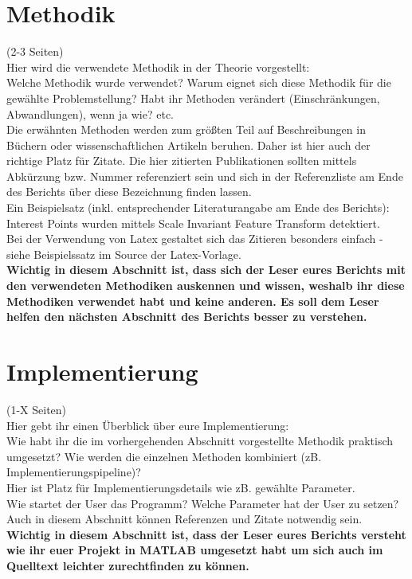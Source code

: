 \documentclass[paper=A4, deutsch]{scrartcl}
\begin{document}
\section{Methodik}
(2-3 Seiten)\\
Hier wird die verwendete Methodik in der Theorie vorgestellt:\\
Welche Methodik wurde verwendet? Warum eignet sich diese Methodik für die gewählte Problemstellung? Habt ihr Methoden verändert (Einschränkungen, Abwandlungen), wenn ja wie? etc.\\
Die erwähnten Methoden werden zum größten Teil auf Beschreibungen in Büchern oder wissenschaftlichen Artikeln beruhen. Daher ist hier auch der richtige Platz für Zitate. Die hier zitierten Publikationen sollten mittels Abkürzung bzw. Nummer referenziert sein und sich in der Referenzliste am Ende des Berichts über diese Bezeichnung finden lassen.\\
Ein Beispielsatz (inkl. entsprechender Literaturangabe am Ende des Berichts): Interest Points wurden mittels Scale Invariant Feature Transform detektiert.\\
Bei der Verwendung von Latex gestaltet sich das Zitieren besonders einfach - siehe Beispielssatz im Source der Latex-Vorlage.\\
\textbf{Wichtig in diesem Abschnitt ist, dass sich der Leser eures Berichts mit den verwendeten Methodiken auskennen und wissen, weshalb ihr diese Methodiken verwendet habt und keine anderen. Es soll dem Leser helfen den nächsten Abschnitt des Berichts besser zu verstehen.}

\section{Implementierung}
(1-X Seiten)\\
Hier gebt ihr einen Überblick über eure Implementierung:\\
Wie habt ihr die im vorhergehenden Abschnitt vorgestellte Methodik praktisch umgesetzt? Wie werden die einzelnen Methoden kombiniert (zB. Implementierungspipeline)?\\
Hier ist Platz für Implementierungsdetails wie zB. gewählte Parameter. \\
Wie startet der User das Programm? Welche Parameter hat der User zu setzen?\\
Auch in diesem Abschnitt können Referenzen und Zitate notwendig sein.\\
\textbf{Wichtig in diesem Abschnitt ist, dass der Leser eures Berichts versteht wie ihr euer Projekt in MATLAB umgesetzt habt um sich auch im Quelltext leichter zurechtfinden zu können.}
\end{document}
